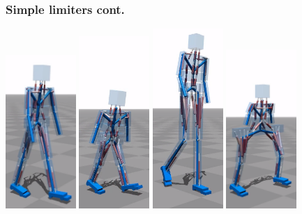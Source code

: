 \documentclass{beamer}
\begin{document}
\begin{frame}
\frametitle{Simple limiters cont.}
\includegraphics[width=0.2\textwidth]{figs/limiters/1.png}
\includegraphics[width=0.2\textwidth]{figs/limiters/2.png}
\includegraphics[width=0.2\textwidth]{figs/limiters/3.png}
\includegraphics[width=0.2\textwidth]{figs/limiters/4.png}

\end{frame}
\end{document}
